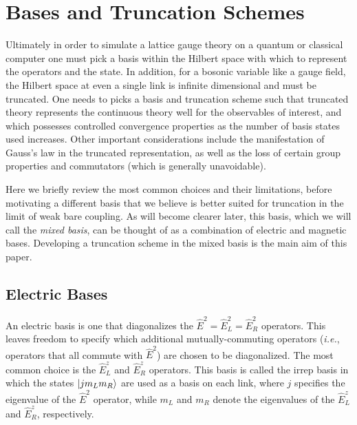 \documentclass[reprint,superscriptaddress,pra,nofootinbib,preprintnumbers,floatfix]{revtex4-1}
\providecommand{\ie}{\emph{i.e.}}
\begin{document}
\section{Bases and Truncation Schemes}
\label{sec:bases_and_trucation}
Ultimately in order to simulate a lattice gauge theory on a quantum or classical computer one must pick a basis within the Hilbert space with which to represent the operators and the state. 
%
In addition, for a bosonic variable like a gauge field, the Hilbert space at even a single link is infinite dimensional and must be truncated. 
%
One needs to picks a basis and truncation scheme such that truncated theory represents the continuous theory well for the observables of interest, and which possesses controlled convergence properties as the number of basis states used increases. 
%
Other important considerations include the manifestation of Gauss's law in the truncated representation, as well as the loss of certain group properties and commutators (which is generally unavoidable). 




Here we briefly review the most common choices and their limitations, before motivating a different basis that we believe is better suited for truncation in the limit of weak bare coupling. 
%
As will become clearer later, this basis, which we will call the \emph{mixed basis}, can be thought of as a combination of electric and magnetic bases.
%
Developing a truncation scheme in the mixed basis is the main aim of this paper.



\subsection{Electric Bases}
\label{subsec:electric_bases}
An electric basis is one that diagonalizes the $\hat{E}^2 = \hat{E}_L^2 = \hat{E}_R^2$ operators.
%
This leaves freedom to specify which additional mutually-commuting operators (\ie, operators that all commute with $\hat{E}^2$) are chosen to be diagonalized.
%
The most common choice is the $\hat{E}_L^z$ and $\hat{E}_R^z$ operators.
%
This basis is called the irrep basis in which the states $\ket{j m_L m_R}$ are used as a basis on each link, where $j$ specifies the eigenvalue of the $\hat{E}^2$ operator, while $m_L$ and $m_R$ denote the eigenvalues of the $\hat{E}_L^z$ and $\hat{E}_R^z$, respectively. 
\end{document}
